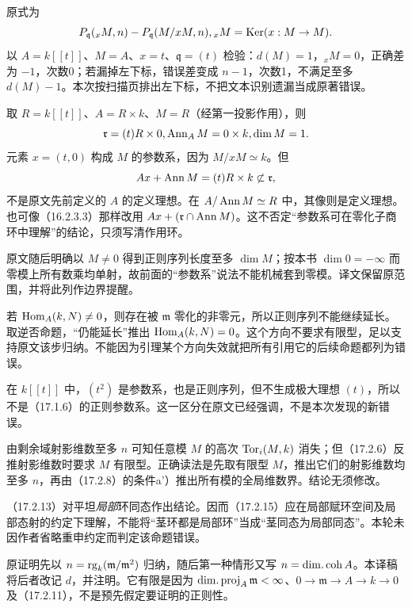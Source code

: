 原式为
\[
 P_{\mathfrak q}({}_xM,n)-P_{\mathfrak q}(M/xM,n),
 {}_xM=\operatorname{Ker}(x:M\to M).
\]
以 $A=k[[t]]$、$M=A$、$x=t$、$\mathfrak q=(t)$ 检验：$d(M)=1$，${}_xM=0$，正确差为 $-1$，次数0；若漏掉左下标，错误差变成 $n-1$，次数1，不满足至多 $d(M)-1$。本次按扫描页排出左下标，不把文本识别遗漏当成原著错误。

取 $R=k[[t]]$、$A=R\times k$、$M=R$（经第一投影作用），则
\[
 \mathfrak r=(t)R\times0,
 \operatorname{Ann}_A M=0\times k,\dim M=1.
\]
元素 $x=(t,0)$ 构成 $M$ 的参数系，因为 $M/xM\simeq k$。但
\[
 Ax+\operatorname{Ann} M=(t)R\times k\not\subset\mathfrak r,
\]
不是原文先前定义的 $A$ 的定义理想。在 $A/\operatorname{Ann} M\simeq R$ 中，其像则是定义理想。也可像（16.2.3.3）那样改用
$Ax+(\mathfrak r\cap\operatorname{Ann} M)$。这不否定“参数系可在零化子商环中理解”的结论，只须写清作用环。

原文随后明确以 $M\ne0$ 得到正则序列长度至多 $\dim M$；按本书 $\dim0=-\infty$ 而零模上所有数乘均单射，故前面的“参数系”说法不能机械套到零模。译文保留原范围，并将此列作边界提醒。

若 $\operatorname{Hom}_A(k,N)\ne0$，则存在被 $\mathfrak m$ 零化的非零元，所以正则序列不能继续延长。取逆否命题，“仍能延长”推出 $\operatorname{Hom}_A(k,N)=0$。这个方向不要求有限型，足以支持原文该步归纳。不能因为引理某个方向失效就把所有引用它的后续命题都列为错误。

在 $k[[t]]$ 中，$(t^2)$ 是参数系，也是正则序列，但不生成极大理想 $(t)$，所以不是（17.1.6）的正则参数系。这一区分在原文已经强调，不是本次发现的新错误。

由剩余域射影维数至多 $n$ 可知任意模 $M$ 的高次 $\operatorname{Tor}_i(M,k)$ 消失；但（17.2.6）反推射影维数时要求 $M$ 有限型。正确读法是先取有限型 $M$，推出它们的射影维数均至多 $n$，再由（17.2.8）的条件a'）推出所有模的全局维数界。结论无须修改。

（17.2.13）对平坦\emph{局部}环同态作出结论。因而（17.2.15）应在局部赋环空间及局部态射的约定下理解，不能将“茎环都是局部环”当成“茎同态为局部同态”。本轮未因作者省略重申约定而判定该命题错误。

原证明先以 $n=\operatorname{rg}_k(\mathfrak m/\mathfrak m^2)$ 归纳，随后第一种情形又写 $n=\operatorname{dim.coh} A$。本译稿将后者改记 $d$，并注明。它有限是因为 $\operatorname{dim.proj}_A\mathfrak m<\infty$、$0\to\mathfrak m\to A\to k\to0$ 及（17.2.11），不是预先假定要证明的正则性。

